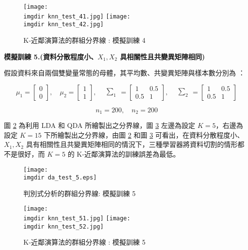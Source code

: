 \begin{figure}[H]
\centering
\texttt{[image: \\imgdir knn\_test\_41.jpg]}
\texttt{[image: \\imgdir knn\_test\_42.jpg]}
\caption{K-近鄰演算法的群組分界線 : 模擬訓練 4} 
\label{fig:knn_test_4}
\end{figure}

\textbf{\large 模擬訓練 5.(資料分散程度小、$X_1, X_2$ 具相關性且共變異矩陣相同)}

假設資料來自兩個雙變量常態的母體，其平均數、共變異矩陣與樣本數分別為 ：

\[\mu_1 = \begin{bmatrix}
0 \\
0
\end{bmatrix}, \quad \mu_2 = \begin{bmatrix}
1 \\
1
\end{bmatrix}, \quad \begin{matrix} \sum_{1} \end{matrix} = \begin{bmatrix}
1 & 0.5\\
0.5 & 1
\end{bmatrix}, \quad \begin{matrix} \sum_{2} \end{matrix} = \begin{bmatrix}
1 & 0.5\\
0.5 & 1
\end{bmatrix}\]

\[n_1 = 200, \quad n_2 = 200\]

圖 \ref{fig:da_test_5} 為利用 LDA 和 QDA 所繪製出之分界線，圖 \ref{fig:knn_test_5} 左邊為設定 $K =5$，右邊為設定 $K = 15$ 下所繪製出之分界線，由圖 \ref{fig:da_test_5} 和圖 \ref{fig:knn_test_5} 可看出，在資料分散程度小、$X_1, X_2$ 具有相關性且共變異矩陣相同的情況下，三種學習器將資料切割的情形都不是很好，而 $K = 5$ 的 K-近鄰演算法的訓練誤差為最低。
\begin{figure}[H]
    \centering
        \texttt{[image: \\imgdir da\_test\_5.eps]}
    \caption{判別式分析的群組分界線: 模擬訓練 5}
    \label{fig:da_test_5}
\end{figure}

\begin{figure}[H]
\centering
\texttt{[image: \\imgdir knn\_test\_51.jpg]}
\texttt{[image: \\imgdir knn\_test\_52.jpg]}
\caption{K-近鄰演算法的群組分界線 : 模擬訓練 5} 
\label{fig:knn_test_5}
\end{figure}

